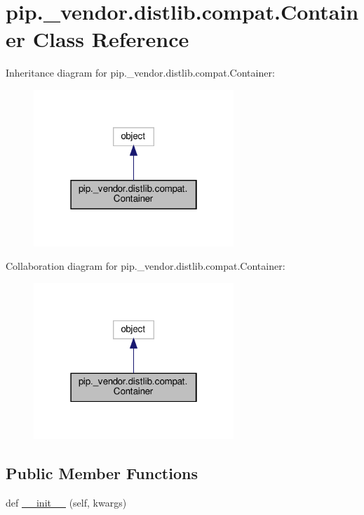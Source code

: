 \hypertarget{classpip_1_1__vendor_1_1distlib_1_1compat_1_1Container}{}\section{pip.\+\_\+vendor.\+distlib.\+compat.\+Container Class Reference}
\label{classpip_1_1__vendor_1_1distlib_1_1compat_1_1Container}


Inheritance diagram for pip.\+\_\+vendor.\+distlib.\+compat.\+Container\+:
\nopagebreak
\begin{figure}[H]
\begin{center}
\leavevmode
\includegraphics[width=214pt]{classpip_1_1__vendor_1_1distlib_1_1compat_1_1Container__inherit__graph}
\end{center}
\end{figure}


Collaboration diagram for pip.\+\_\+vendor.\+distlib.\+compat.\+Container\+:
\nopagebreak
\begin{figure}[H]
\begin{center}
\leavevmode
\includegraphics[width=214pt]{classpip_1_1__vendor_1_1distlib_1_1compat_1_1Container__coll__graph}
\end{center}
\end{figure}
\subsection*{Public Member Functions}
\begin{DoxyCompactItemize}
\item 
def \hyperlink{classpip_1_1__vendor_1_1distlib_1_1compat_1_1Container_a2ecf16bce9b7045854c257ab2ca753f9}{\+\_\+\+\_\+init\+\_\+\+\_\+} (self, kwargs)
\end{DoxyCompactItemize}



